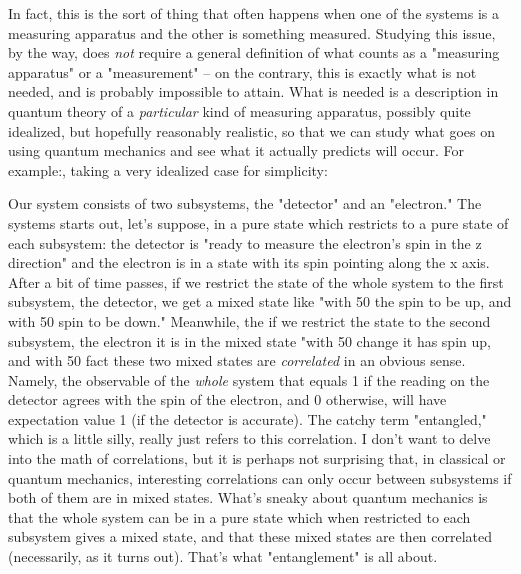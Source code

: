 In fact, this is the sort of thing that often happens when one of
the systems is a measuring apparatus and the other is something
measured.  Studying this issue, by the way, does \emph{not} require a
general definition of what counts as a "measuring apparatus" or a
"measurement" -- on the contrary, this is exactly what is not
needed, and is probably impossible to attain.  What is needed is a
description in quantum theory of a \emph{particular} kind of measuring
apparatus, possibly quite idealized, but hopefully reasonably
realistic, so that we can study what goes on using quantum
mechanics and see what it actually predicts will occur. 
For example:, taking a very idealized case for simplicity:

Our system consists of two subsystems, the "detector" and an
"electron."  The systems starts out, let's suppose, in a pure
state which restricts to a pure state of each subsystem: the
detector is "ready to measure the electron's spin in the z
direction" and the electron is in a state with its spin pointing
along the x axis.  After a bit of time passes, if we restrict the
state of the whole system to the first subsystem, the detector,
we get a mixed state like "with 50%
the spin to be up, and with 50%
spin to be down."  Meanwhile, the if we restrict the state to the
second subsystem, the electron it is in the mixed state "with 50%
change it has spin up, and with 50%
fact these two mixed states are \emph{correlated} in an obvious sense.
Namely, the observable of the \emph{whole} system that equals 1 if the
reading on the detector agrees with the spin of the electron, and
0 otherwise, will have expectation value 1 (if the detector is
accurate).  The catchy term "entangled," which is a little silly,
really just refers to this correlation.  I don't want to delve
into the math of correlations, but it is perhaps not surprising
that, in classical or quantum mechanics, interesting correlations
can only occur between subsystems if both of them are in mixed
states.  What's sneaky about quantum mechanics is that the whole
system can be in a pure state which when restricted to each
subsystem gives a mixed state, and that these mixed states are
then correlated (necessarily, as it turns out).  That's what
"entanglement" is all about.

